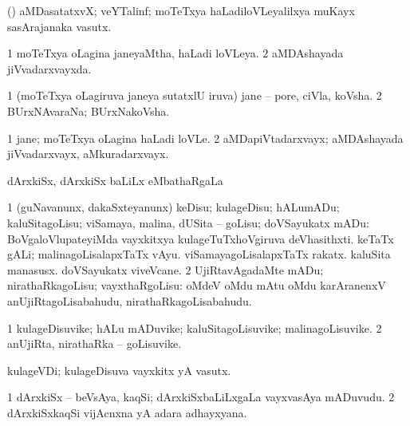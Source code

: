 \bentry
{} 
\gl{\nA}
\expl{}
\bmng
 (\ravi) aMDasatatxvX; veYTalinf; moTeTxya haLadiloVLeyalilxya muKayx sasArajanaka vasutx. 
\emng
\eentry

\bentry
{} 
\gl{\gu}
\expl{}
\bmng
\bnum
\num{1} moTeTxya oLagina janeyaMtha, haLadi loVLeya. 
\num{2} aMDAshayada jiVvadarxvayxda. 
\enum
\emng
\eentry

\bentry
{}
\gl{\nA}
\expl{}
\bmng
\bnum
\num{1} (moTeTxya oLagiruva janeya sutatxlU iruva) jane -- pore, ciVla, koVsha. 
\num{2} BUrxNAvaraNa; BUrxNakoVsha. 
\enum
\emng
\eentry

\bentry
{} 
\gl{\nA}
\bmng
\bnum
\num{1} jane; moTeTxya oLagina haLadi loVLe. 
\num{2} aMDapiVtadarxvayx; aMDAshayada jiVvadarxvayx, aMkuradarxvayx. 
\enum
\emng
\eentry

\bentry 
{} 
\gl{\sapUpa}
\expl{}
\bmng
 dArxkiSx, dArxkiSx baLiLx eMbathaRgaLa \sapUpa 
\emng
\eentry

\bentry 
{} 
\gl{\sakirx}
\expl{}
\bmng
\bnum
\num{1} (guNavanunx, dakaSxteyanunx) keDisu; kulageDisu; hALumADu; kaluSitagoLisu; viSamaya, malina, dUSita -- goLisu; doVSayukatx mADu:  BoVgaloVlupateyiMda vayxkitxya kulageTuTxhoVgiruva deVhasithxti.  keTaTx gALi; malinagoLisalapxTaTx vAyu.  viSamayagoLisalapxTaTx rakatx.  kaluSita manasusx.  doVSayukatx viveVcane. 
\num{2} UjiRtavAgadaMte mADu; nirathaRkagoLisu; vayxthaRgoLisu:  oMdeV oMdu mAtu oMdu karAranenxV anUjiRtagoLisabahudu, nirathaRkagoLisabahudu. 
\enum
\emng
\eentry

\bentry 
{} 
\gl{\nA}
\expl{}
\bmng
\bnum
\num{1} kulageDisuvike; hALu mADuvike; kaluSitagoLisuvike; malinagoLisuvike. 
\num{2} anUjiRta, nirathaRka -- goLisuvike. 
\enum
\emng
\eentry

\bentry 
{} 
\gl{\nA}
\expl{}
\bmng
 kulageVDi; kulageDisuva vayxkitx yA vasutx. 
\emng
\eentry

\bentry 
{} 
\gl{\nA}
\expl{}
\bmng
\bnum
\num{1} dArxkiSx -- beVsAya, kaqSi; dArxkiSxbaLiLxgaLa vayxvasAya mADuvudu. 
\num{2} dArxkiSxkaqSi vijAcnxna yA adara adhayxyana. 
\enum
\emng
\eentry


